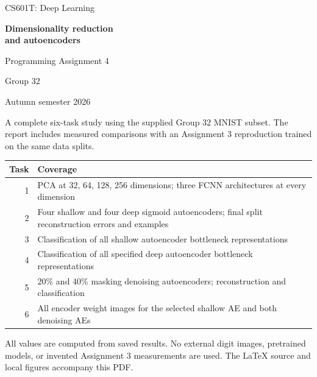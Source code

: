 \documentclass[11pt,a4paper]{article}
\begin{document}
\hypersetup{pageanchor=false}

\begin{titlepage}\thispagestyle{empty}

{\color{accent}\large CS601T: Deep Learning}\par\vspace{24mm}

{\color{ink}\Huge\bfseries Dimensionality reduction\\and autoencoders}\par\vspace{8mm}

{\LARGE Programming Assignment 4}\par\vspace{4mm}

{\Large Group 32}\par\vspace{5mm}

{\large Autumn semester 2026}\par\vspace{10mm}

A complete six-task study using the supplied Group 32 MNIST subset. The report includes measured comparisons with an Assignment 3 reproduction trained on the same data splits.


\begingroup\small\setlength{\tabcolsep}{5pt}

\begin{tabularx}{\linewidth}{rY}

\toprule

\textbf{Task} & \textbf{Coverage} \\

\midrule

1 & PCA at 32, 64, 128, 256 dimensions; three FCNN architectures at every dimension \\

2 & Four shallow and four deep sigmoid autoencoders; final split reconstruction errors and examples \\

3 & Classification of all shallow autoencoder bottleneck representations \\

4 & Classification of all specified deep autoencoder bottleneck representations \\

5 & 20\% and 40\% masking denoising autoencoders; reconstruction and classification \\

6 & All encoder weight images for the selected shallow AE and both denoising AEs \\

\bottomrule\end{tabularx}\endgroup\par\medskip

All values are computed from saved results. No external digit images, pretrained models, or invented Assignment 3 measurements are used. The LaTeX source and local figures accompany this PDF.


\vfill\end{titlepage}\hypersetup{pageanchor=true}
\end{document}
